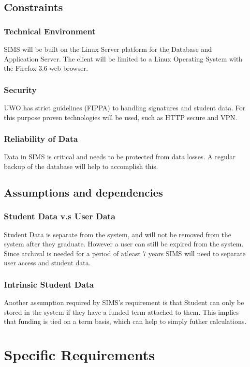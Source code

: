 \documentclass[11pt,a4paper]{report}
\begin{document}
\subsection{Constraints}

\subsubsection{Technical Environment}
SIMS will be built on the Linux Server platform for the Database and Application Server. The client will be limited to a Linux Operating System with the Firefox 3.6 web browser.  
\subsubsection{Security}
UWO has strict guidelines (FIPPA) to handling signatures and student data. For this purpose proven technologies will be used, such as HTTP secure and VPN.
\subsubsection{Reliability of Data}
Data in SIMS is critical and needs to be protected from data losses. A regular backup of the database will help to accomplish this. 

\subsection{Assumptions and dependencies}
\subsubsection{Student Data v.s User Data}
Student Data is separate from the system, and will not be removed from the system after they graduate. However a user can still be expired from the system. Since archival is needed for a period of atleast 7 years SIMS will need to separate user access and student data. 
\subsubsection{Intrinsic Student Data}
Another assumption required by SIMS's requirement is that Student can only be stored in the system if they have a funded term attached to them. This implies that funding is tied on a term basis, which can help to simply futher calculations. 

\section{Specific Requirements}
\end{document}
